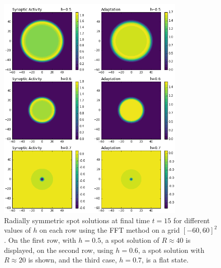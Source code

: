 \documentclass{uonmathreport}
\begin{document}
\begin{figure}
	\begin{center}
		\includegraphics[width=0.8\textwidth]{Figures/AdaptFFT_L=60.png}
	\end{center}
	\caption{Radially symmetric spot solutions at final time $t=15$ for different values of $h$ on each row using the FFT method on a grid $[-60, 60]^2$. On the first row, with $h=0.5$, a spot solution of $R \approx 40$ is displayed, on the second row, using $h=0.6$, a spot solution with $R \approx 20$ is shown, and the third case, $h=0.7$, is a flat state.}
	\label{fig:adapt_fft_L_60}
\end{figure}
\end{document}
